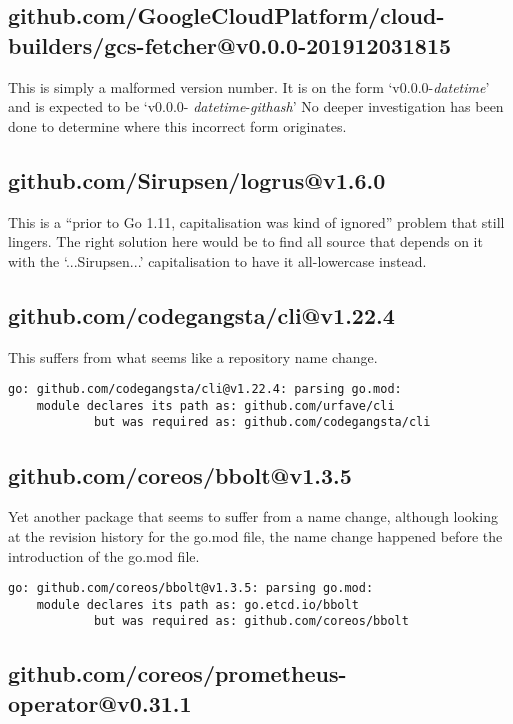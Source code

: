 \documentclass[a4paper]{paper}
\begin{document}
\subsection{github.com/GoogleCloudPlatform/cloud-builders/gcs-fetcher@v0.0.0-201912031815}

This is simply a malformed version number. It is on the form
`v0.0.0-{\it datetime}' and is expected to be `v0.0.0-{\it
  datetime}-{\it githash}' No deeper investigation has been done to
determine where this incorrect form originates.

\subsection{github.com/Sirupsen/logrus@v1.6.0}

This is a ``prior to Go 1.11, capitalisation was kind of ignored''
problem that still lingers. The right solution here would be to find
all source that depends on it with the `...Sirupsen...' capitalisation
to have it all-lowercase instead.

\subsection{github.com/codegangsta/cli@v1.22.4}

This suffers from what seems like a repository name change.

\begin{verbatim}
go: github.com/codegangsta/cli@v1.22.4: parsing go.mod:
	module declares its path as: github.com/urfave/cli
	        but was required as: github.com/codegangsta/cli
\end{verbatim}

\subsection{github.com/coreos/bbolt@v1.3.5}

Yet another package that seems to suffer from a name change, although
looking at the revision history for the go.mod file, the name change
happened before the introduction of the go.mod file.

\begin{verbatim}
go: github.com/coreos/bbolt@v1.3.5: parsing go.mod:
	module declares its path as: go.etcd.io/bbolt
	        but was required as: github.com/coreos/bbolt
\end{verbatim}

\subsection{github.com/coreos/prometheus-operator@v0.31.1}
\end{document}
